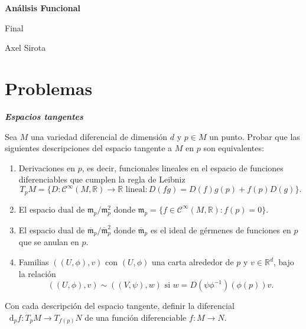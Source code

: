 \documentclass[11pt]{article}
\newcommand{\R}{{\mathbb{R}}}
\newcommand*\diff{\mathop{}\!\mathrm{d}}
\numberwithin{theorem}{subsection}
\begin{document}
	\pagestyle{empty}
	\pagestyle{fancy}
	\fancyfoot[CO]{\slshape \thepage}
	\renewcommand{\headrulewidth}{0pt}
	
	
	
	\centerline{\bf An\'alisis Funcional}
	\centerline{\sc Final}
	\centerline{\sc Axel Sirota}
	
	\tableofcontents
	\newpage
	
\section{Problemas}

\textsl{\textbf{Espacios tangentes}}
\vspace{1em}


\begin{question}
	Sea $M$ una variedad diferencial de dimensi\'on $d$ y $p\in M$ un punto. Probar que las siguientes descripciones del espacio tangente a $M$ en $p$ son equivalentes:
	\begin{enumerate}
		\item Derivaciones en $p$, es decir, funcionales lineales en el espacio de funciones diferenciables que cumplen la regla de Leibniz $$T_pM=\{D:\mathscr{C}^\infty(M,\R)\to\R\text{ lineal}: D(fg)=D(f)g(p)+f(p)D(g)\}.$$ 
		\item El espacio dual de $\mathfrak{m}_p/\mathfrak{m}_p^2$ donde $\mathfrak{m}_p=\{f\in\mathscr{C}^\infty(M,\R):f(p)=0\}$.
		\item El espacio dual de $\overline{\mathfrak{m}}_p/\overline{\mathfrak{m}}_p^2$ donde $\overline{\mathfrak{m}}_p$ es el ideal de g\'ermenes de funciones en $p$ que se anulan en $p$.
		\item Familias $((U,\phi),v)$ con $(U,\phi)$ una carta alrededor de $p$ y $v\in\R^d$, bajo la relaci\'on $$((U,\phi),v)\sim ((V,\psi),w) \text{ si }w = D(\psi\phi^{-1})(\phi(p))v.$$
	\end{enumerate}
	Con cada descripci\'on del espacio tangente, definir la diferencial $\diff_pf:T_pM\to T_{f(p)}N$ de una funci\'on diferenciable $f:M\to N$.
\end{question}
\end{document}
